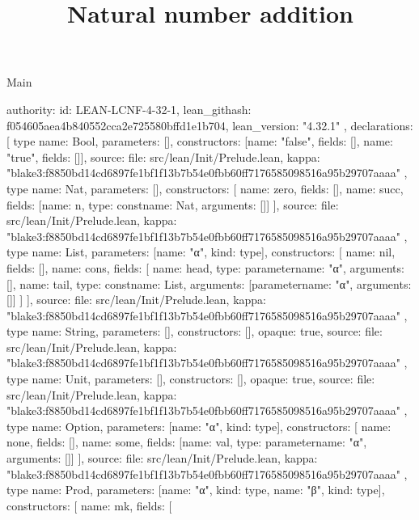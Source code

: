 \begin{lexlean}{Main}
\title{Natural number addition}
\begin{toolingmodule}
{
  authority: {
    id: LEAN-LCNF-4-32-1,
    lean_githash: f054605aea4b840552cca2e725580bffd1e1b704,
    lean_version: "4.32.1"
  },
  declarations: [
    type{
      name: Bool,
      parameters: [],
      constructors: [{name: "false", fields: []}, {name: "true", fields: []}],
      source: {
        file: src/lean/Init/Prelude.lean,
        kappa: "blake3:f8850bd14cd6897fe1bf1f13b7b54e0fbb60ff7176585098516a95b29707aaaa"
      }
    },
    type{
      name: Nat,
      parameters: [],
      constructors: [
        {name: zero, fields: []},
        {name: succ, fields: [{name: n, type: const{name: Nat, arguments: []}}]}
      ],
      source: {
        file: src/lean/Init/Prelude.lean,
        kappa: "blake3:f8850bd14cd6897fe1bf1f13b7b54e0fbb60ff7176585098516a95b29707aaaa"
      }
    },
    type{
      name: List,
      parameters: [{name: "α", kind: type{}}],
      constructors: [
        {name: nil, fields: []},
        {
          name: cons,
          fields: [
            {name: head, type: parameter{name: "α", arguments: []}},
            {name: tail, type: const{name: List, arguments: [parameter{name: "α", arguments: []}]}}
          ]
        }
      ],
      source: {
        file: src/lean/Init/Prelude.lean,
        kappa: "blake3:f8850bd14cd6897fe1bf1f13b7b54e0fbb60ff7176585098516a95b29707aaaa"
      }
    },
    type{
      name: String,
      parameters: [],
      constructors: [],
      opaque: true,
      source: {
        file: src/lean/Init/Prelude.lean,
        kappa: "blake3:f8850bd14cd6897fe1bf1f13b7b54e0fbb60ff7176585098516a95b29707aaaa"
      }
    },
    type{
      name: Unit,
      parameters: [],
      constructors: [],
      opaque: true,
      source: {
        file: src/lean/Init/Prelude.lean,
        kappa: "blake3:f8850bd14cd6897fe1bf1f13b7b54e0fbb60ff7176585098516a95b29707aaaa"
      }
    },
    type{
      name: Option,
      parameters: [{name: "α", kind: type{}}],
      constructors: [
        {name: none, fields: []},
        {name: some, fields: [{name: val, type: parameter{name: "α", arguments: []}}]}
      ],
      source: {
        file: src/lean/Init/Prelude.lean,
        kappa: "blake3:f8850bd14cd6897fe1bf1f13b7b54e0fbb60ff7176585098516a95b29707aaaa"
      }
    },
    type{
      name: Prod,
      parameters: [{name: "α", kind: type{}}, {name: "β", kind: type{}}],
      constructors: [
        {
          name: mk,
          fields: [
}}}
\end{toolingmodule}
\end{lexlean}

